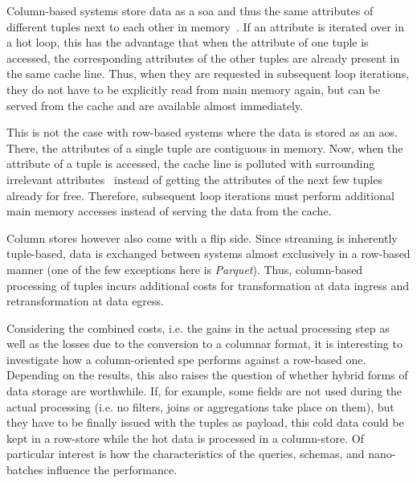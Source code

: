 Column-based systems store data as a \ac{soa} and thus the same attributes of different tuples next to each other in memory~\cite{DBLP:conf/sigmod/AbadiMH08,DBLP:conf/vldb/AilamakiDHS01}.
If an attribute is iterated over in a hot loop, this has the advantage that when the attribute of one tuple is accessed, the corresponding attributes of the other tuples are already present in the same cache line.
Thus, when they are requested in subsequent loop iterations, they do not have to be explicitly read from main memory again, but can be served from the cache and are available almost immediately.

This is not the case with row-based systems where the data is stored as an \ac{aos}.
There, the attributes of a single tuple are contiguous in memory.
Now, when the attribute of a tuple is accessed, the cache line is polluted with surrounding irrelevant attributes~\cite{DBLP:conf/sigmod/AbadiMH08,DBLP:conf/vldb/AilamakiDHS01} instead of getting the attributes of the next few tuples already for free.
Therefore, subsequent loop iterations must perform additional main memory accesses instead of serving the data from the cache.

Column stores however also come with a flip side.
Since streaming is inherently tuple-based, data is exchanged between systems almost exclusively in a row-based manner (one of the few exceptions here is \emph{Parquet}).
Thus, column-based processing of tuples incurs additional costs for transformation at data ingress and retransformation at data egress.

Considering the combined costs, i.e. the gains in the actual processing step as well as the losses due to the conversion to a columnar format, it is interesting to investigate how a column-oriented \ac{spe} performs against a row-based one.
Depending on the results, this also raises the question of whether hybrid forms of data storage are worthwhile.
If, for example, some fields are not used during the actual processing (i.e. no filters, joins or aggregations take place on them), but they have to be finally issued with the tuples as payload, this cold data could be kept in a row-store while the hot data is processed in a column-store.
Of particular interest is how the characteristics of the queries, schemas, and nano-batches influence the performance.